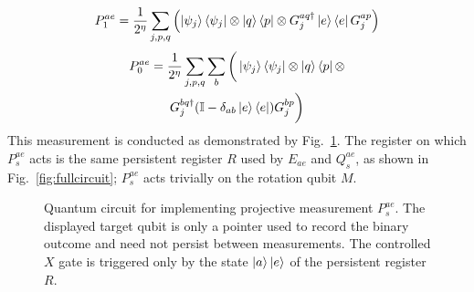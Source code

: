 \documentclass[aps,floatfix,10pt,amssymb,amsfont,amsmath,superscriptaddress,float,nofootinbib,longbibliography,nobalancelastpage,twocolumn]{revtex4-2}
\begin{document}
\begin{equation}
    P^{ae}_1 = \frac{1}{2^{\eta}}\sum_{j,p,q} \left( \ket{\psi_j}\bra{\psi_j} \otimes \ket{q}\bra{p} \otimes G_j^{aq\dagger}\ket{e}\bra{e}G_j^{ap} \right)
\end{equation}
\begin{multline}
    P^{ae}_0 = \frac{1}{2^{\eta}}\sum_{j,p,q} \sum_{b}\bigg( \ket{\psi_j}\bra{\psi_j} \otimes \ket{q}\bra{p} \otimes \\G_j^{bq\dagger}(\mathbb{I} - \delta_{ab}\ket{e}\bra{e})G_j^{bp}  \bigg)
\end{multline}
This measurement is conducted as demonstrated by Fig.~\ref{fig:Pcircuit}. The register on which $P_s^{ae}$ acts is the same persistent register $R$ used by $E_{ae}$ and $Q_s^{ae}$, as shown in Fig.~\ref{fig:fullcircuit}; $P_s^{ae}$ acts trivially on the rotation qubit $M$.
\begin{figure}

\caption{Quantum circuit for implementing projective measurement $P_s^{ae}$. The displayed target qubit is only a pointer used to record the binary outcome and need not persist between measurements. The controlled $X$ gate is triggered only by the state $\ket{a}\ket{e}$ of the persistent register $R$.}
\label{fig:Pcircuit}
\end{figure}
\end{document}
